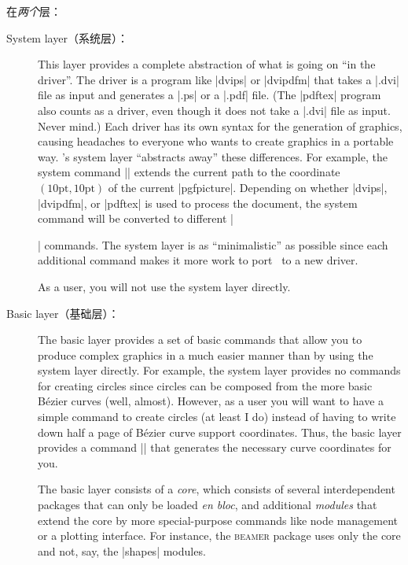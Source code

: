 在\emph{两个}层：
%
\begin{description}
    \item[System layer（系统层）：] This layer provides a complete abstraction of what
        is going on ``in the driver''. The driver is a program like |dvips|
        or |dvipdfm| that takes a |.dvi| file as input and generates a |.ps|
        or a |.pdf| file. (The |pdftex| program also counts as a driver, even
        though it does not take a |.dvi| file as input. Never mind.) Each
        driver has its own syntax for the generation of graphics, causing
        headaches to everyone who wants to create graphics in a portable way.
        \pgfname's system layer ``abstracts away'' these differences. For
        example, the system command |\pgfsys@lineto{10pt}{10pt}| extends the
        current path  to the coordinate $(10\mathrm{pt},10\mathrm{pt})$ of
        the current |{pgfpicture}|. Depending on whether |dvips|, |dvipdfm|,
        or |pdftex| is used to process the document, the system command will
        be converted to different |\special| commands. The system layer is as
        ``minimalistic'' as possible since each additional command makes it
        more work to port \pgfname\ to a new driver.

        As a user, you will not use the system layer directly.
    \item[Basic layer（基础层）：] The basic layer provides a set of basic commands that
        allow you to produce complex graphics in a much easier manner than by
        using the system layer directly. For example, the system layer provides
        no commands for creating circles since circles can be composed from the
        more basic Bézier curves (well, almost). However, as a user you will
        want to have a simple command to create circles (at least I do) instead
        of having to write down half a page of Bézier curve support
        coordinates. Thus, the basic layer provides a command |\pgfpathcircle|
        that generates the necessary curve coordinates for you.

        The basic layer consists of a \emph{core}, which consists of several
        interdependent packages that can only be loaded \emph{en bloc}, and
        additional \emph{modules} that extend the core by more
        special-purpose commands like node management or a plotting
        interface. For instance, the \textsc{beamer} package uses only the
        core and not, say, the |shapes| modules.
\end{description}

